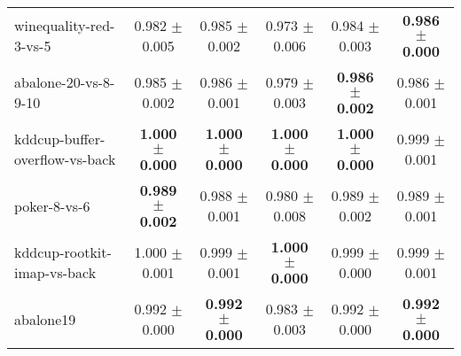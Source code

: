 \begin{table}[!ht]
{\begin{tabular}{l c c c c c}
winequality-red-3-vs-5 & 0.982 $\pm$ 0.005 & 0.985 $\pm$ 0.002 & 0.973 $\pm$ 0.006 & 0.984 $\pm$ 0.003 & \textbf{0.986 $\pm$ 0.000} \\
abalone-20-vs-8-9-10 & 0.985 $\pm$ 0.002 & 0.986 $\pm$ 0.001 & 0.979 $\pm$ 0.003 & \textbf{0.986 $\pm$ 0.002} & 0.986 $\pm$ 0.001 \\
kddcup-buffer-overflow-vs-back & \textbf{1.000 $\pm$ 0.000} & \textbf{1.000 $\pm$ 0.000} & \textbf{1.000 $\pm$ 0.000} & \textbf{1.000 $\pm$ 0.000} & 0.999 $\pm$ 0.001 \\
poker-8-vs-6 & \textbf{0.989 $\pm$ 0.002} & 0.988 $\pm$ 0.001 & 0.980 $\pm$ 0.008 & 0.989 $\pm$ 0.002 & 0.989 $\pm$ 0.001 \\
kddcup-rootkit-imap-vs-back & 1.000 $\pm$ 0.001 & 0.999 $\pm$ 0.001 & \textbf{1.000 $\pm$ 0.000} & 0.999 $\pm$ 0.000 & 0.999 $\pm$ 0.001 \\
abalone19 & 0.992 $\pm$ 0.000 & \textbf{0.992 $\pm$ 0.000} & 0.983 $\pm$ 0.003 & 0.992 $\pm$ 0.000 & \textbf{0.992 $\pm$ 0.000} \\
\end{tabular}}
\end{table}
